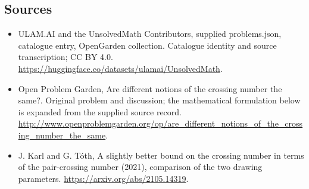 \documentclass[11pt,a4paper]{article}
\begin{document}
\subsection{Sources}
\begin{itemize}
\item[S1] ULAM.AI and the UnsolvedMath Contributors, supplied problems.json, catalogue entry, OpenGarden collection. Catalogue identity and source transcription; CC BY 4.0.
\url{https://huggingface.co/datasets/ulamai/UnsolvedMath}.
\item[S2] Open Problem Garden, Are different notions of the crossing number the same?. Original problem and discussion; the mathematical formulation below is expanded from the supplied source record.
\url{http://www.openproblemgarden.org/op/are_different_notions_of_the_crossing_number_the_same}.
\item[S3] J. Karl and G. Tóth, A slightly better bound on the crossing number in terms of the pair-crossing number (2021), comparison of the two drawing parameters.
\url{https://arxiv.org/abs/2105.14319}.

\end{itemize}
\end{document}
